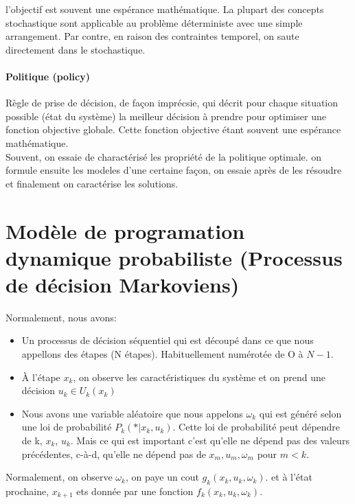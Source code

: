 \documentclass[oneside]{book}
\begin{document}
l'objectif est souvent une espérance mathématique. La plupart des concepts stochastique sont applicable au problème déterministe avec une simple arrangement. Par contre, en raison des contraintes temporel, on saute directement dans le stochastique. \\

\paragraph{Politique (policy)} Règle de prise de décision, de façon imprécsie, qui décrit pour chaque situation possible (état du système) la meilleur décision à prendre pour optimiser une fonction objective globale. Cette fonction objective étant souvent une espérance mathématique.\\

Souvent, on essaie de charactérisé les propriété de la politique optimale. on formule ensuite les modeles d'une certaine façon, on essaie après de les résoudre et finalement on caractérise les solutions.\\

\section{Modèle de programation dynamique probabiliste (Processus de décision Markoviens)} 
Normalement, nous avons:

\begin{itemize}
\item Un processus de décision séquentiel qui est découpé dans ce que nous appellons des étapes (N étapes). Habituellement numérotée de O à $N-1$. 

\item À l'étape $x_k$, on observe les caractéristiques du système et on prend une décision $u_k \in U_k(x_k)$

\item Nous avons une variable aléatoire que nous appelons $\omega_k$ qui est généré selon une loi de probabilité $P_k(*|x_k,u_k)$. Cette loi de probabilité peut dépendre de k, $x_k$, $u_k$. Mais ce qui est important c'est qu'elle ne dépend pas des valeurs précédentes, c-à-d, qu'elle ne dépend pas de $x_m,u_m,\omega_m$ pour $m < k$.
\end{itemize}

Normalement, on observe $\omega_k$, on paye un cout $g_k(x_k,u_k,\omega_k)$. et à l'état prochaine, $x_{k+1}$ ets donnée par une fonction $f_k(x_k,u_k,\omega_k)$.\\
\end{document}
